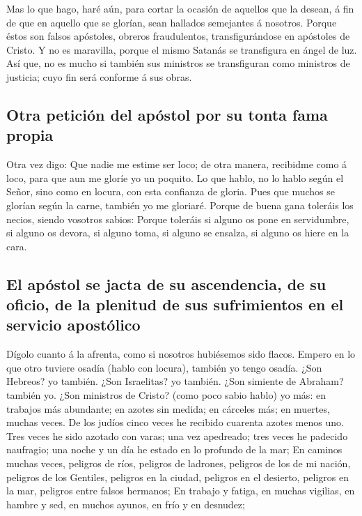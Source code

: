  Mas lo que hago, haré aún, para cortar la ocasión de
aquellos que la desean, á fin de que en aquello que se glorían, sean
hallados semejantes á nosotros.  Porque éstos son falsos
apóstoles, obreros fraudulentos, transfigurándose en apóstoles de
Cristo.  Y no es maravilla, porque el mismo Satanás se
transfigura en ángel de luz.  Así que, no es mucho si
también sus ministros se transfiguran como ministros de justicia; cuyo
fin será conforme á sus obras.

\hypertarget{otra-peticiuxf3n-del-apuxf3stol-por-su-tonta-fama-propia}{%
\subsection{Otra petición del apóstol por su tonta fama
propia}\label{otra-peticiuxf3n-del-apuxf3stol-por-su-tonta-fama-propia}}

 Otra vez digo: Que nadie me estime ser loco; de otra
manera, recibidme como á loco, para que aun me gloríe yo un poquito.
 Lo que hablo, no lo hablo según el Señor, sino como en
locura, con esta confianza de gloria.  Pues que muchos se
glorían según la carne, también yo me gloriaré.  Porque
de buena gana toleráis los necios, siendo vosotros sabios:
 Porque toleráis si alguno os pone en servidumbre, si
alguno os devora, si alguno toma, si alguno se ensalza, si alguno os
hiere en la cara.

\hypertarget{el-apuxf3stol-se-jacta-de-su-ascendencia-de-su-oficio-de-la-plenitud-de-sus-sufrimientos-en-el-servicio-apostuxf3lico}{%
\subsection{El apóstol se jacta de su ascendencia, de su oficio, de la
plenitud de sus sufrimientos en el servicio
apostólico}\label{el-apuxf3stol-se-jacta-de-su-ascendencia-de-su-oficio-de-la-plenitud-de-sus-sufrimientos-en-el-servicio-apostuxf3lico}}

 Dígolo cuanto á la afrenta, como si nosotros hubiésemos
sido flacos. Empero en lo que otro tuviere osadía (hablo con locura),
también yo tengo osadía.  ¿Son Hebreos? yo también. ¿Son
Israelitas? yo también. ¿Son simiente de Abraham? también yo.
 ¿Son ministros de Cristo? (como poco sabio hablo) yo
más: en trabajos más abundante; en azotes sin medida; en cárceles más;
en muertes, muchas veces.  De los judíos cinco veces he
recibido cuarenta azotes menos uno.  Tres veces he sido
azotado con varas; una vez apedreado; tres veces he padecido naufragio;
una noche y un día he estado en lo profundo de la mar; 
En caminos muchas veces, peligros de ríos, peligros de ladrones,
peligros de los de mi nación, peligros de los Gentiles, peligros en la
ciudad, peligros en el desierto, peligros en la mar, peligros entre
falsos hermanos;  En trabajo y fatiga, en muchas
vigilias, en hambre y sed, en muchos ayunos, en frío y en desnudez;

